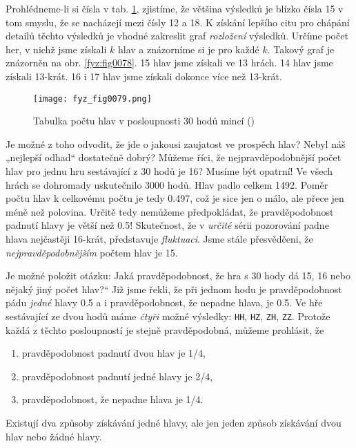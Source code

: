     Prohlédneme-li si čísla v tab. \ref{fyz:fig0079}, zjistíme, že většina výsledků je blízko čísla 
    \num{15} v tom smyslu, že se nacházejí mezi čísly \num{12} a \num{18}. K získání lepšího citu 
    pro chápání detailů těchto výsledků je vhodné zakreslit graf \emph{rozložení} výsledků. Určíme 
    počet her, v nichž jsme získali \(k\) hlav a znázorníme si je pro každé \(k\). Takový graf je 
    znázorněn na obr. \ref{fyz:fig0078}. \num{15} hlav jsme získali ve \num{13} hrách. \num{14} 
    hlav jsme získali \num{13}-krát. \num{16} i \num{17} hlav jsme získali dokonce více než 
    \num{13}-krát.

    \begin{figure}[ht!]  %
      \centering
      \texttt{[image: fyz\_fig0079.png]}
      \caption{Tabulka počtu hlav v posloupnosti \num{30} hodů mincí (\cite[s.~80]{Feynman01})}
      \label{fyz:fig0079}
    \end{figure}
    Je možné z toho odvodit, že jde o jakousi zaujatost ve prospěch hlav? Nebyl náš „nejlepší 
    odhad“ dostatečně dobrý? Můžeme říci, že nejpravděpodobnější počet hlav pro jednu hru 
    sestávající z \num{30} hodů je \num{16}? Musíme být opatrní! Ve všech hrách se dohromady 
    uskutečnilo \num{3000} hodů. Hlav padlo celkem \num{1492}. Poměr počtu hlav k celkovému počtu 
    je tedy \num{0.497}, což je sice jen o málo, ale přece jen méně než polovina. Určitě tedy 
    nemůžeme předpokládat, že pravděpodobnost padnutí hlavy je větší než \num{0.5}! Skutečnost, že 
    v \emph{určité} sérii pozorování padne hlava nejčastěji \num{16}-krát, představuje 
    \emph{fluktuaci}. Jsme stále přesvědčeni, že \emph{nejpravděpodobnějším} počtem hlav je 
    \num{15}.
    
    Je možné položit otázku: Jaká pravděpodobnost, že hra s \num{30} hody dá \num{15}, \num{16} 
    nebo nějaký jiný počet hlav?“ Již jsme řekli, že při jednom hodu je pravděpodobnost pádu 
    \emph{jedné} hlavy \num{0.5} a i pravděpodobnost, že nepadne hlava, je \num{0.5}. Ve hře 
    sestávající ze dvou hodů máme \emph{čtyři} možné výsledky: \texttt{HH}, \texttt{HZ}, 
    \texttt{ZH}, \texttt{ZZ}. Protože každá z těchto posloupností je stejně pravděpodobná, můžeme 
    prohlásit, že
    \begin{enumerate}[noitemsep]
      \item pravděpodobnost padnutí dvou hlav je \num{1/4}, 
      \item pravděpodobnost padnutí jedné hlavy je \num{2/4}, 
      \item pravděpodobnost, že nepadne hlava je \num{1/4}. 
    \end{enumerate}
    Existují dva způsoby získávání jedné hlavy, ale jen jeden způsob získávání dvou hlav nebo žádné 
    hlavy.
    
